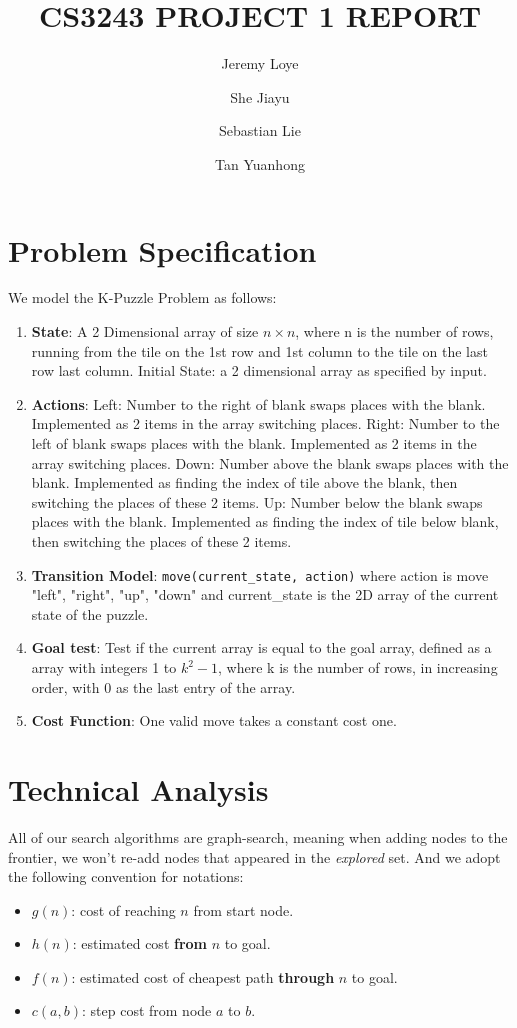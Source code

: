 \documentclass{llncs}
\begin{document}
\title{CS3243 PROJECT 1 REPORT}
\author{Jeremy Loye \and She Jiayu \and Sebastian Lie \and Tan Yuanhong}
\maketitle
\section{Problem Specification}
We model the K-Puzzle Problem as follows:
\begin{enumerate}
	\item \textbf{State}: A 2 Dimensional array of size $n \times n$, where n is the number of rows, running from the tile on the 1st row and 1st column to the tile on the last row last column. Initial State: a 2 dimensional array as specified by input.
	\item \textbf{Actions}: Left: Number to the right of blank swaps places with the blank. Implemented as 2 items in the array switching places. Right: Number to the left of blank swaps places with the blank. Implemented as 2 items in the array switching places. Down: Number above the blank swaps places with the blank. Implemented as finding the index of tile above the blank, then switching the places of these 2 items. Up: Number below the blank swaps places with the blank. Implemented as finding the index of tile below blank, then switching the places of these 2 items.
	\item \textbf{Transition Model}: \texttt{move(current\_state, action)} where action is move "left", "right", "up", "down" and current\_state is the 2D array of the current state of the puzzle.
	\item \textbf{Goal test}: Test if the current array is equal to the goal array, defined as a array with integers 1 to $k^2 - 1$, where k is the number of rows, in increasing order, with 0 as the last entry of the array.
	\item \textbf{Cost Function}: One valid move takes a constant cost one.
\end{enumerate}

\section{Technical Analysis}
All of our search algorithms are graph-search, meaning when adding nodes to the frontier, we won’t re-add nodes that appeared in the \emph{explored} set. And we adopt the following convention for notations:
\begin{itemize}
	\item $g(n)$: cost of reaching $n$ from start node.
	\item $h(n)$: estimated cost \textbf{from} $n$ to goal.
	\item $f(n)$: estimated cost of cheapest path \textbf{through} $n$ to goal.
	\item $c(a,b)$: step cost from node $a$ to $b$.
\end{itemize}
\end{document}
